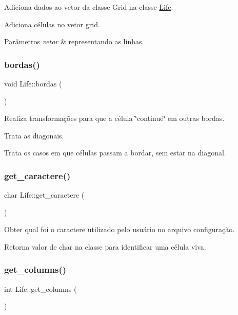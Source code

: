 Adiciona dados ao vetor da classe Grid na classe \hyperlink{classLife}{Life}. 

Adiciona células no vetor grid. 
\begin{DoxyParams}{Parâmetros}
{\em vetor} & representando as linhas. \\
\hline
\end{DoxyParams}
\mbox{\label{classLife_a80aac6b6b00f8cf0589207953f3f844b}} 
\subsubsection{\texorpdfstring{bordas()}{bordas()}}
{\footnotesize\ttfamily void Life\+::bordas (\begin{DoxyParamCaption}{ }\end{DoxyParamCaption})}



Realiza transformações para que a célula \char`\"{}continue\char`\"{} em outras bordas. 

Trata as diagonais.

Trata os casos em que células passam a bordar, sem estar na diagonal. \mbox{\label{classLife_a21ada75e45a4a244eeab403fb34534fe}} 
\subsubsection{\texorpdfstring{get\+\_\+caractere()}{get\_caractere()}}
{\footnotesize\ttfamily char Life\+::get\+\_\+caractere (\begin{DoxyParamCaption}{ }\end{DoxyParamCaption})}

Obter qual foi o caractere utilizado pelo usuário no arquivo configuração. \begin{DoxyReturn}{Retorna}
valor de char na classe para identificar uma célula viva. 
\end{DoxyReturn}
\mbox{\label{classLife_ac82f1ba83db36b3142ec12c2fc334de3}} 
\subsubsection{\texorpdfstring{get\+\_\+columns()}{get\_columns()}}
{\footnotesize\ttfamily int Life\+::get\+\_\+columns (\begin{DoxyParamCaption}{ }\end{DoxyParamCaption})}

